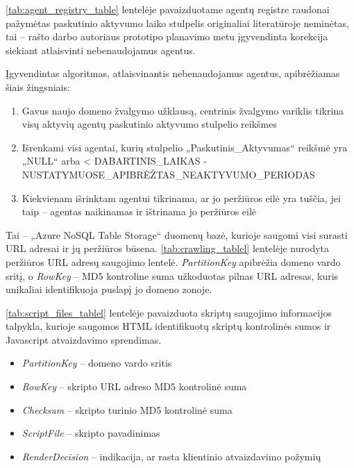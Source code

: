  
 
 \ref{tab:agent_registry_table} lentelėje pavaizduotame agentų registre raudonai pažymėtas paskutinio aktyvumo laiko stulpelis originaliai \cite{MercedCloudBasedWebCrawler} literatūroje neminėtas, tai -- rašto darbo autoriaus prototipo planavimo metu įgyvendinta korekcija siekiant atlaisvinti nebenaudojamus agentus.
 
 Įgyvendintas algoritmas, atlaisvinantis nebenaudojamus agentus, apibrėžiamas šiais žingsniais:
 
 \begin{enumerate}
     \item Gavus naujo domeno žvalgymo užklausą, centrinis žvalgymo variklis tikrina visų aktyvių agentų paskutinio aktyvumo stulpelio reikšmes
     \item Išrenkami visi agentai, kurių stulpelio „Paskutinis\_Aktyvumas“ reikšmė yra „NULL“ arba < DABARTINIS\_LAIKAS - NUSTATYMUOSE\_APIBRĖŽTAS\_NEAKTYVUMO\_PERIODAS 
     \item Kiekvienam išrinktam agentui tikrinama, ar jo peržiūros eilė yra tuščia, jei taip -- agentas naikinamas ir ištrinama jo peržiūros eilė
 \end{enumerate}
 

Tai -- „Azure NoSQL Table Storage“ duomenų bazė, kurioje saugomi visi surasti URL adresai ir jų peržiūros būsena. \ref{tab:crawling_tablel} lentelėje nurodyta peržiūros URL adresų saugojimo lentelė. \textit{PartitionKey} apibrėžia domeno vardo sritį, o \textit{RowKey} -- MD5 kontroline suma užkoduotas pilnas URL adresas, kuris unikaliai identifikuoja puslapį jo domeno zonoje.



\ref{tab:script_files_tablel} lentelėje pavaizduota skriptų saugojimo informacijos talpykla, kurioje saugomos HTML identifikuotų skriptų kontrolinės sumos ir Javascript atvaizdavimo sprendimas.

\pagebreak

\begin{itemize}
    \item \textit{PartitionKey} -- domeno vardo sritis
    \item \textit{RowKey} -- skripto URL adreso MD5 kontrolinė suma
    \item \textit{Checksum} -- skripto turinio MD5 kontrolinė suma
    \item \textit{ScriptFile} -- skripto pavadinimas
    \item \textit{RenderDecision} -- indikacija, ar rasta klientinio atvaizdavimo požymių
\end{itemize}

